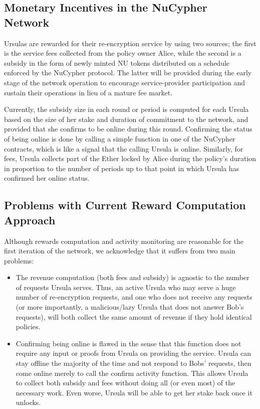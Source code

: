 \subsection{Monetary Incentives in the NuCypher Network}
Ursulas are rewarded for their re-encryption service by using two sources; the first is the service fees collected from the policy owner Alice, while the second is a subsidy in the form of newly minted NU tokens distributed on a schedule enforced by the NuCypher protocol. The latter will be provided during the early stage of the network operation to encourage service-provider participation and sustain their operations in lieu of a mature fee market.


Currently, the subsidy size in each round or period is computed for each Ursula based on the size of her stake and duration of commitment to the network, and provided that she confirms to be online during this round. Confirming the status of being online is done by calling a simple function in one of the NuCypher contracts, which is like a signal that the calling Ursula is online. Similarly, for fees, Ursula collects part of the Ether locked by Alice during the policy's duration in proportion to the number of periods up to that point in which Ursula has confirmed her online status.


\subsection{Problems with Current Reward Computation Approach}
Although rewards computation and activity monitoring are reasonable for the first iteration of the network, we acknowledge that it suffers from two main problems:
\begin{itemize}
\setlength{\itemsep}{0pt}
\item The revenue computation (both fees and subsidy) is agnostic to the number of requests Ursula serves. Thus, an active Ursula who may serve a huge number of re-encryption requests, and one who does not receive any requests (or more importantly, a malicious/lazy Ursula that does not answer Bob's requests), will both collect the same amount of revenue if they hold identical policies.

\item Confirming being online is flawed in the sense that this function does not require any input or proofs from Ursula on providing the service. Ursula can stay offline the majority of the time and not respond to Bobs' requests, then come online merely to call the confirm activity function. This allows Ursula to collect both subsidy and fees without doing all (or even most) of the necessary work. Even worse, Ursula will be able to get her stake back once it unlocks.
\end{itemize}

